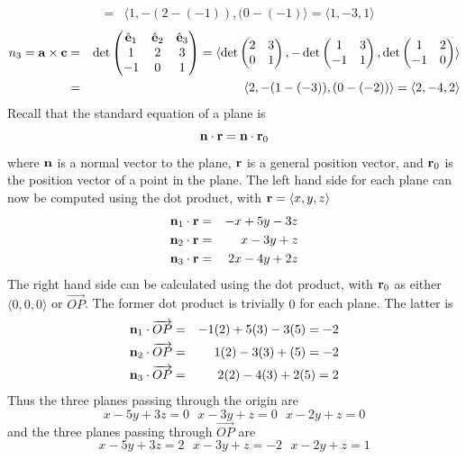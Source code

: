 \documentclass[12pt]{amsbook}
\newcommand{\la}{\langle}
\newcommand{\ra}{\rangle}
\begin{document}
\begin{enumerate}
\begin{eqnarray*}
&=&\la 1, -(2-(-1)), (0-(-1) \ra =\la 1,-3, 1 \ra
\end{eqnarray*}
\begin{eqnarray*}
n_3={\bf a}\times{\bf c}&=&\det
\begin{pmatrix}
\hat{\bf e}_1 & \hat{\bf e}_2 & \hat{\bf e}_3\cr 1&2&3\cr -1&0&1 \end{pmatrix}=\la \det\begin{pmatrix}2&3\cr 0&1  \end{pmatrix},-\det\begin{pmatrix}1&3\cr -1&1  \end{pmatrix},\det\begin{pmatrix}1&2\cr -1&0 \end{pmatrix} \ra \\
&=&\la 2,-(1-(-3)), (0-(-2)) \ra =\la 2,-4,2 \ra
\end{eqnarray*}
Recall that the standard equation of a plane is
$${\bf n}\cdot {\bf r}={\bf n}\cdot {\bf r}_0$$ where ${\bf n}$ is a normal vector to the plane, ${\bf r}$ is a general position vector, and ${\bf r}_0$ is the position vector of a point in the plane. The left hand side for each plane can now be computed using the dot product, with ${\bf r}=\la x,y,z \ra$
\begin{eqnarray*}
{\bf n}_1\cdot {\bf r}&=&-x+5y-3z \\
{\bf n}_2\cdot {\bf r}&=&x-3y+z\\
{\bf n}_3\cdot {\bf r}&=&2x-4y+2z
\end{eqnarray*}
The right hand side can be calculated using the dot product, with ${\bf r}_0$ as either $\la 0,0,0\ra$ or $\overrightarrow{OP}$. The former dot product is trivially $0$ for each plane. The latter is
\begin{eqnarray*}
{\bf n}_1\cdot \overrightarrow{OP}&=&-1(2)+5(3)-3(5)=-2 \\
{\bf n}_2\cdot \overrightarrow{OP}&=&1(2)-3(3)+(5)=-2\\
{\bf n}_3\cdot \overrightarrow{OP}&=&2(2)-4(3)+2(5)=2
\end{eqnarray*}
Thus the three planes passing through the origin are
$$x-5y+3z=0 \ \ \ x-3y+z=0 \ \ \ x-2y+z=0$$
and the three planes passing through $\overrightarrow{OP}$ are
$$x-5y+3z=2 \ \ \ x-3y+z=-2 \ \ \ x-2y+z=1$$


\end{enumerate}
\end{document}
